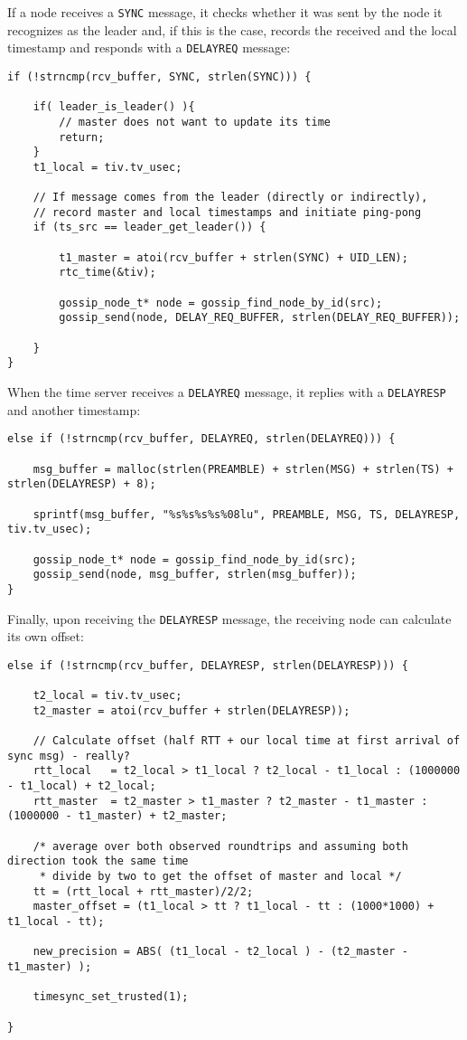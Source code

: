 \documentclass[11pt,
  a4paper,
  ngerman,
  BCOR=7mm
]{scrartcl}
\begin{document}
If a node receives a \lstinline!SYNC! message, it checks whether it was
sent by the node it recognizes as the leader and, if this is the case,
records the received and the local timestamp and responds with
a \lstinline!DELAYREQ! message:

\begin{lstlisting}
if (!strncmp(rcv_buffer, SYNC, strlen(SYNC))) {

    if( leader_is_leader() ){
        // master does not want to update its time
        return;
    }
    t1_local = tiv.tv_usec;

    // If message comes from the leader (directly or indirectly),
    // record master and local timestamps and initiate ping-pong
    if (ts_src == leader_get_leader()) {

        t1_master = atoi(rcv_buffer + strlen(SYNC) + UID_LEN);
        rtc_time(&tiv);

        gossip_node_t* node = gossip_find_node_by_id(src);
        gossip_send(node, DELAY_REQ_BUFFER, strlen(DELAY_REQ_BUFFER));

    }
}
\end{lstlisting}

When the time server receives a \lstinline!DELAYREQ! message, it replies
with a \lstinline!DELAYRESP! and another timestamp:

\begin{lstlisting}
else if (!strncmp(rcv_buffer, DELAYREQ, strlen(DELAYREQ))) {

    msg_buffer = malloc(strlen(PREAMBLE) + strlen(MSG) + strlen(TS) + strlen(DELAYRESP) + 8);

    sprintf(msg_buffer, "%s%s%s%s%08lu", PREAMBLE, MSG, TS, DELAYRESP, tiv.tv_usec);

    gossip_node_t* node = gossip_find_node_by_id(src);
    gossip_send(node, msg_buffer, strlen(msg_buffer));
}
\end{lstlisting}

Finally, upon receiving the \lstinline!DELAYRESP! message, the receiving
node can calculate its own offset:

\begin{lstlisting}
else if (!strncmp(rcv_buffer, DELAYRESP, strlen(DELAYRESP))) {

    t2_local = tiv.tv_usec;
    t2_master = atoi(rcv_buffer + strlen(DELAYRESP));

    // Calculate offset (half RTT + our local time at first arrival of sync msg) - really?
    rtt_local   = t2_local > t1_local ? t2_local - t1_local : (1000000 - t1_local) + t2_local;
    rtt_master  = t2_master > t1_master ? t2_master - t1_master : (1000000 - t1_master) + t2_master;

    /* average over both observed roundtrips and assuming both direction took the same time
     * divide by two to get the offset of master and local */
    tt = (rtt_local + rtt_master)/2/2;
    master_offset = (t1_local > tt ? t1_local - tt : (1000*1000) + t1_local - tt);

    new_precision = ABS( (t1_local - t2_local ) - (t2_master - t1_master) );

    timesync_set_trusted(1);

}
\end{lstlisting}
\end{document}
